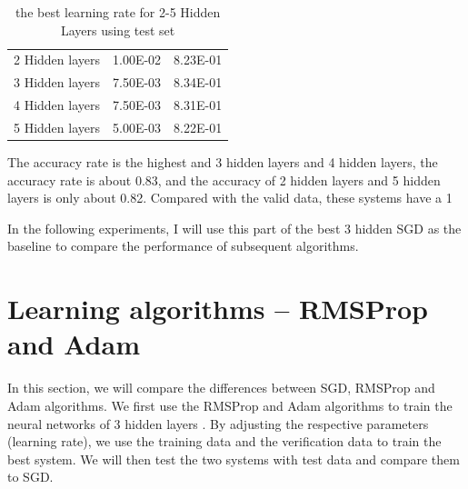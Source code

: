 \documentclass{article}
\begin{document}
\begin{table}[htbp]
  \centering
  \caption{the best learning rate for 2-5 Hidden Layers using test set}
    \begin{tabular}{|c|c|c|}
    \toprule
    \multicolumn{1}{|c|}{\multirow{2}[2]{*}{2 Hidden layers}} & \multirow{2}[2]{*}{1.00E-02} & \multirow{2}[2]{*}{8.23E-01} \\
          &       &  \\
    \midrule
    \multicolumn{1}{|c|}{\multirow{2}[2]{*}{3 Hidden layers}} & \multirow{2}[2]{*}{7.50E-03} & \multirow{2}[2]{*}{8.34E-01} \\
          &       &  \\
    \midrule
    \multicolumn{1}{|c|}{\multirow{2}[2]{*}{4 Hidden layers}} & \multirow{2}[2]{*}{7.50E-03} & \multirow{2}[2]{*}{8.31E-01} \\
          &       &  \\
    \midrule
    \multicolumn{1}{|c|}{\multirow{2}[2]{*}{5 Hidden layers}} & \multirow{2}[2]{*}{5.00E-03} & \multirow{2}[2]{*}{8.22E-01} \\
          &       &  \\
    \bottomrule
    \end{tabular}%
  \label{tab:addlabel}%
\end{table}%



The accuracy rate is the highest and 3 hidden layers and 4 hidden layers, the accuracy rate is about 0.83, and the accuracy of 2 hidden layers and 5 hidden layers is only about 0.82. Compared with the valid data, these systems have a 1%

In the following experiments, I will use this part of the best 3 hidden SGD as the baseline to compare the performance of subsequent algorithms.




\section{Learning algorithms -- RMSProp and Adam}


In this section, we will compare the differences between SGD, RMSProp and Adam algorithms. We first use the RMSProp and Adam algorithms to train the neural networks of 3 hidden layers . By adjusting the respective parameters (learning rate), we use the training data and the verification data to train the best system. We will then test the two systems with test data and compare them to SGD.
\end{document}
